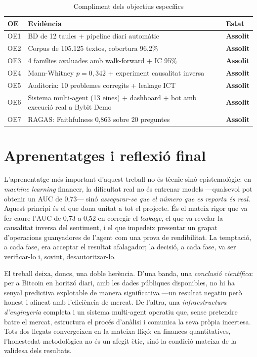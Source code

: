\documentclass[12pt, a4paper]{report}
\begin{document}
\begin{table}[H]
\centering
\caption{Compliment dels objectius específics}
\label{tab:compliment}
\begin{tabular}{@{}lL{6.2cm}L{4.6cm}@{}}
\toprule
\textbf{OE} & \textbf{Evidència} & \textbf{Estat} \\
\midrule
OE1 & BD de 12 taules + pipeline diari automàtic & \textcolor{accentgreen}{\textbf{Assolit}} \\
OE2 & Corpus de 105.125 textos, cobertura 96,2\% & \textcolor{accentgreen}{\textbf{Assolit}} \\
OE3 & 4 famílies avaluades amb walk-forward + IC 95\% & \textcolor{accentgreen}{\textbf{Assolit}} \\
OE4 & Mann-Whitney $p=0{,}342$ + experiment causalitat inversa & \textcolor{accentgreen}{\textbf{Assolit}} \\
OE5 & Auditoria: 10 problemes corregits + leakage ICT & \textcolor{accentgreen}{\textbf{Assolit}} \\
OE6 & Sistema multi-agent (13 eines) + dashboard + bot amb execució real a Bybit Demo & \textcolor{accentgreen}{\textbf{Assolit}} \\
OE7 & RAGAS: Faithfulness 0,863 sobre 20 preguntes & \textcolor{accentgreen}{\textbf{Assolit}} \\
\bottomrule
\end{tabular}
\end{table}

\section{Aprenentatges i reflexió final}

L'aprenentatge més important d'aquest treball no és tècnic sinó epistemològic: en \textit{machine learning} financer, la dificultat real no és entrenar models ---qualsevol pot obtenir un AUC de 0,73--- sinó \emph{assegurar-se que el número que es reporta és real}. Aquest principi és el que dona unitat a tot el projecte. És el mateix rigor que va fer caure l'AUC de 0,73 a 0,52 en corregir el \textit{leakage}, el que va revelar la causalitat inversa del sentiment, i el que impedeix presentar un grapat d'operacions guanyadores de l'agent com una prova de rendibilitat. La temptació, a cada fase, era acceptar el resultat afalagador; la decisió, a cada fase, va ser verificar-lo i, sovint, desautoritzar-lo.

El treball deixa, doncs, una doble herència. D'una banda, una \emph{conclusió científica}: per a Bitcoin en horitzó diari, amb les dades públiques disponibles, no hi ha senyal predictiva explotable de manera significativa ---un resultat negatiu però honest i alineat amb l'eficiència de mercat. De l'altra, una \emph{infraestructura d'enginyeria} completa i un sistema multi-agent operatiu que, sense pretendre batre el mercat, estructura el procés d'anàlisi i comunica la seva pròpia incertesa. Tots dos llegats convergeixen en la mateixa lliçó: en finances quantitatives, l'honestedat metodològica no és un afegit ètic, sinó la condició mateixa de la validesa dels resultats.
\end{document}
